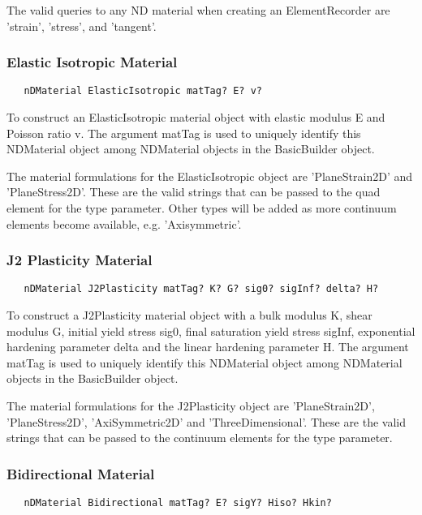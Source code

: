 \documentclass[12pt]{article}
\begin{document}
The valid queries to any ND material when creating an ElementRecorder
are 'strain', 'stress', and 'tangent'.

\subsubsection{Elastic Isotropic Material}
{\sf\small
\begin{verbatim}
   nDMaterial ElasticIsotropic matTag? E? v?
\end{verbatim}
}

To construct an ElasticIsotropic material object with elastic modulus
E and Poisson ratio v. The argument matTag is used to
uniquely identify this NDMaterial object among NDMaterial objects
in the BasicBuilder object.

The material formulations for the ElasticIsotropic object are 'PlaneStrain2D' and
'PlaneStress2D'. These are the valid strings that can be passed to the quad
element for the type parameter. Other types will be added as more
continuum elements become available, e.g. 'Axisymmetric'.

\subsubsection{J2 Plasticity Material}
{\sf\small
\begin{verbatim}
   nDMaterial J2Plasticity matTag? K? G? sig0? sigInf? delta? H?
\end{verbatim}
}

To construct a J2Plasticity material object with a bulk modulus
K, shear modulus G, initial yield stress sig0, final saturation yield
stress sigInf, exponential hardening parameter delta and the linear
hardening parameter H. The argument matTag is used to uniquely
identify this NDMaterial object among NDMaterial objects in the
BasicBuilder object. 

The material formulations for the J2Plasticity object are 'PlaneStrain2D',
'PlaneStress2D', 'AxiSymmetric2D' and 'ThreeDimensional'.  These are
the valid strings that can be passed to the continuum elements for the type
parameter. 

\subsubsection{Bidirectional Material}
{\sf\small
\begin{verbatim}
   nDMaterial Bidirectional matTag? E? sigY? Hiso? Hkin?
\end{verbatim}
}
\end{document}
